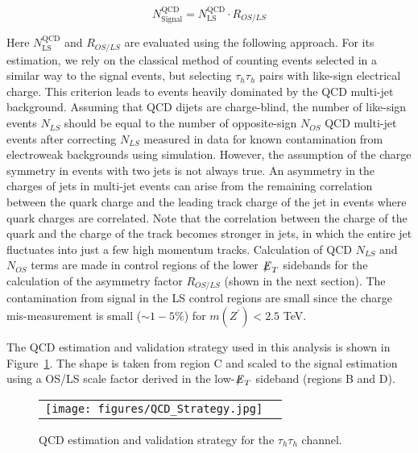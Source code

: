 \begin{equation}                                                                                                                                                      
N_{\textrm{Signal}}^{\textrm{QCD}} = N_{\textrm{LS}}^{\textrm{QCD}} \cdot R_{OS/LS}
\end{equation}
   
Here $N_{\textrm{LS}}^{\textrm{QCD}}$ and $R_{OS/LS}$ are evaluated using the following approach. For its estimation, we rely on the classical method of counting events selected in a similar way to the signal events, but selecting $\tau_{h}\tau_{h}$ pairs with like-sign electrical charge. This criterion leads to events heavily dominated by the QCD multi-jet background. Assuming that QCD dijets are charge-blind, the number of like-sign events $N_{LS}$ should be equal to the number of opposite-sign $N_{OS}$ QCD multi-jet events after correcting $N_{LS}$ measured in data for known contamination from electroweak backgrounds using simulation. However, the assumption of the charge symmetry in events with two jets is not always true. An asymmetry in the charges of jets in multi-jet events can arise from the remaining correlation
between the quark charge and the leading track charge of the jet in events where quark charges are correlated. 
Note that the correlation between the charge of the quark and the charge of the track
becomes stronger in jets, in which the entire jet fluctuates into just a few high momentum tracks. Calculation of QCD $N_{LS}$ and $N_{OS}$ terms are made in control regions of the lower ${\not\mathrel{E}}_T$ sidebands for the calculation of the asymmetry factor $R_{OS/LS}$ (shown in the next section). 
The contamination from signal in the LS control regions are small since the charge mis-measurement is small ($\sim 1-5\%$) for $m(Z^{\prime}) < 2.5$ TeV. 

The QCD estimation and validation strategy used in this analysis is shown in Figure~\ref{fig:qcd}. The shape is taken from region C and scaled to the signal estimation using a OS/LS scale factor derived in the low-${\not\mathrel{E}}_T$ sideband (regions B and D).    

 \begin{figure}[tbh!]
     \centering
     \begin{tabular}{cc}
       \texttt{[image: figures/QCD\_Strategy.jpg]}
     \end{tabular}
     \caption{QCD estimation and validation strategy for the $\tau_{h}\tau_{h}$ channel.}
    \label{fig:qcd}
   \end{figure}


